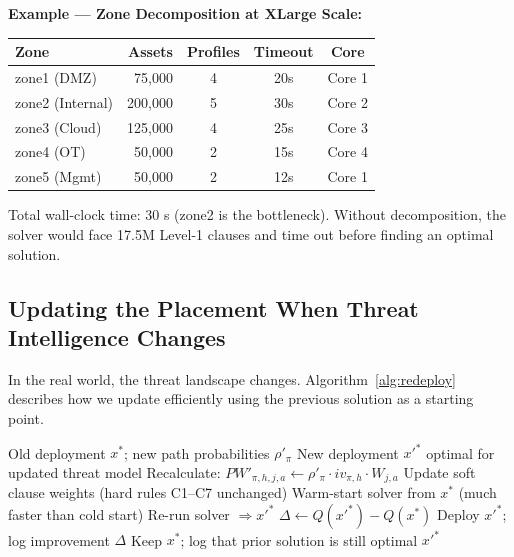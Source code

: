 \documentclass[journal]{IEEEtran}
\begin{document}
\begin{examplebox}
\textbf{Example --- Zone Decomposition at XLarge Scale:}
\begin{center}
\small
\renewcommand{\arraystretch}{1.1}
\begin{tabular}{@{}lrccc@{}}
\toprule
\textbf{Zone} & \textbf{Assets} & \textbf{Profiles} &
\textbf{Timeout} & \textbf{Core} \\
\midrule
zone1 (DMZ)      &  75,000 & 4 & 20s & Core 1 \\
zone2 (Internal) & 200,000 & 5 & 30s & Core 2 \\
zone3 (Cloud)    & 125,000 & 4 & 25s & Core 3 \\
zone4 (OT)       &  50,000 & 2 & 15s & Core 4 \\
zone5 (Mgmt)     &  50,000 & 2 & 12s & Core 1 \\
\bottomrule
\end{tabular}
\end{center}
Total wall-clock time: 30 s (zone2 is the bottleneck).
Without decomposition, the solver would face 17.5M
Level-1 clauses and time out before finding an optimal
solution.
\end{examplebox}

\subsection{Updating the Placement When Threat Intelligence
            Changes}

In the real world, the threat landscape changes.
Algorithm~\ref{alg:redeploy} describes how we update
efficiently using the previous solution as a starting point.

\begin{algorithm}[htbp]
\caption{Adaptive Redeployment When Threat Priors Change}
\label{alg:redeploy}
\begin{algorithmic}[1]
\REQUIRE Old deployment $x^*$;
         new path probabilities $\rho'_\pi$
\ENSURE  New deployment $x'^*$ optimal for updated threat
         model
\STATE Recalculate:
  $PW'_{\pi,h,j,a} \leftarrow
   \rho'_\pi \cdot iv_{\pi,h} \cdot W_{j,a}$
\STATE Update soft clause weights (hard rules C1--C7
       unchanged)
\STATE Warm-start solver from $x^*$ (much faster than cold
       start)
\STATE Re-run solver $\Rightarrow x'^*$
\STATE $\Delta \leftarrow Q(x'^*) - Q(x^*)$
  \STATE Deploy $x'^*$; log improvement $\Delta$
\ELSE
  \STATE Keep $x^*$; log that prior solution is still optimal
\ENDIF
\RETURN $x'^*$
\end{algorithmic}
\end{algorithm}
\end{document}
